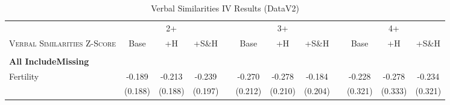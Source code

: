 \begin{landscape}\begin{table}[htpb!]\caption{Verbal Similarities IV Results (DataV2)}
\label{TWINtab:IVAll}
\begin{center}\begin{tabular}{lcccp{2mm}cccp{2mm}ccc}
\toprule \toprule 
&\multicolumn{3}{c}{2+}&&\multicolumn{3}{c}{3+}&&\multicolumn{3}{c}{4+}\\ \cmidrule(r){2-4} \cmidrule(r){6-8} \cmidrule(r){10-12} 
\textsc{Verbal Similarities Z-Score}&Base&+H&+S\&H&&Base&+H&+S\&H&&Base&+H&+S\&H\\ \midrule 
\begin{footnotesize}\end{footnotesize}& 
\begin{footnotesize}\end{footnotesize}& 
\begin{footnotesize}\end{footnotesize}& 
\begin{footnotesize}\end{footnotesize}& 
\begin{footnotesize}\end{footnotesize}& 
\begin{footnotesize}\end{footnotesize}& 
\begin{footnotesize}\end{footnotesize}& 
\begin{footnotesize}\end{footnotesize}& 
\begin{footnotesize}\end{footnotesize}& 
\begin{footnotesize}\end{footnotesize}& 
\begin{footnotesize}\end{footnotesize}& 
\begin{footnotesize}\end{footnotesize}\\ 
\multicolumn{12}{l}{\textbf{All IncludeMissing}}\\ 
Fertility&-0.189&-0.213&-0.239&&-0.270&-0.278&-0.184&&-0.228&-0.278&-0.234\\
&(0.188)&(0.188)&(0.197)&&(0.212)&(0.210)&(0.204)&&(0.321)&(0.333)&(0.321)\\

\end{tabular}
\end{center}
\end{table}
\end{landscape}

